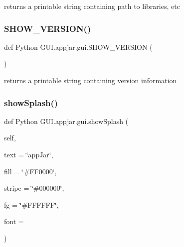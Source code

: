\begin{DoxyVerb}
\begin{DoxyVerb}returns a printable string containing path to libraries, etc \end{DoxyVerb}
 \mbox{\label{class_python_01_g_u_i_1_1appjar_1_1gui_a30977a1675121e381ad79eb21bcf46cb}} 
\subsubsection{\texorpdfstring{S\+H\+O\+W\+\_\+\+V\+E\+R\+S\+I\+O\+N()}{SHOW\_VERSION()}}
{\footnotesize\ttfamily def Python G\+U\+I.\+appjar.\+gui.\+S\+H\+O\+W\+\_\+\+V\+E\+R\+S\+I\+ON (\begin{DoxyParamCaption}{ }\end{DoxyParamCaption})\hspace{0.3cm}{\ttfamily [static]}}

\begin{DoxyVerb}returns a printable string containing version information \end{DoxyVerb}
 \mbox{\label{class_python_01_g_u_i_1_1appjar_1_1gui_ac15d37bf52372417f1f95c0ba245cf10}} 
\subsubsection{\texorpdfstring{show\+Splash()}{showSplash()}}
{\footnotesize\ttfamily def Python G\+U\+I.\+appjar.\+gui.\+show\+Splash (\begin{DoxyParamCaption}\item[{}]{self,  }\item[{}]{text = {\ttfamily \char`\"{}appJar\char`\"{}},  }\item[{}]{fill = {\ttfamily \char`\"{}\#FF0000\char`\"{}},  }\item[{}]{stripe = {\ttfamily \char`\"{}\#000000\char`\"{}},  }\item[{}]{fg = {\ttfamily \char`\"{}\#FFFFFF\char`\"{}},  }\item[{}]{font = {} }\end{DoxyParamCaption})}


\end{DoxyVerb}
